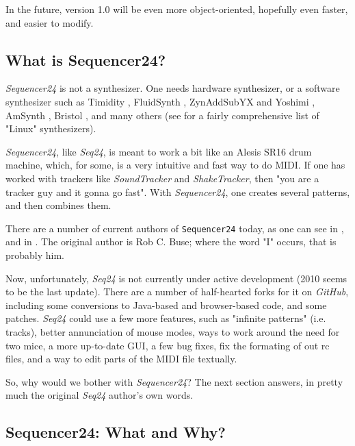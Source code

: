 \documentclass[
 11pt,
 twoside,
 a4paper,
 headinclude,
 footinclude,
 final                                 %
]{article}
\begin{document}
   In the future, version 1.0 will be even more object-oriented, hopefully
   even faster, and easier to modify.

\subsection{What is Sequencer24?}
\label{subsec:what_is_seqeuncer24}

   \textsl{Sequencer24} is not a synthesizer.  One needs hardware
   synthesizer, or a software synthesizer such as Timidity \cite{timidity},
   FluidSynth \cite{fluidsynth}, ZynAddSubYX \cite{zynaddsubfx} and Yoshimi
   \cite{yoshimi} \cite{yoshimi2}, AmSynth \cite{amsynth}, Bristol
   \cite{bristol}, and many others (see \cite{linuxsynths} for a fairly
   comprehensive list of "Linux" synthesizers).

   \textsl{Sequencer24}, like \textsl{Seq24},
   is meant to work a bit like an Alesis SR16 drum machine,
   which, for some, is a very intuitive and fast way to do MIDI.
   If one has worked with trackers like \textsl{SoundTracker} and
   \textsl{ShakeTracker}, then "you are a tracker guy and it gonna go fast".
   With \textsl{Sequencer24}, one creates several patterns, and then
   combines them.

   There are a number of current authors of \texttt{Sequencer24} today,
   as one can see in ,
   and in .
   The original author is Rob C. Buse; where the word "I" occurs, that is
   probably him.

   Now, unfortunately, \textsl{Seq24} is not currently under active
   development (2010 seems to be the last update).  There are a number of
   half-hearted forks for it on \textsl{GitHub}, including some conversions
   to Java-based and browser-based code, and some patches.
   \textsl{Seq24} could use a few more features, such as "infinite
   patterns" (i.e. tracks), better annunciation of mouse modes,
   ways to work around the need for two mice, a more up-to-date GUI,
   a few bug fixes, fix the formating of out rc files,
   and a way to edit parts of the MIDI file textually.

   So, why would we bother with \textsl{Sequencer24}?  The next section answers,
   in pretty much the original \textsl{Seq24} author's own words.

\subsection{Sequencer24: What and Why?}
\label{subsec:introduction_seq24_vs_others}
\end{document}
